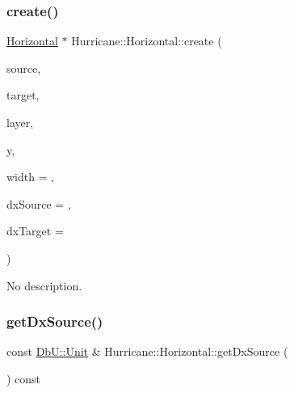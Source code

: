 \subsubsection{\texorpdfstring{create()}{create()}\hspace{0.1cm}{\footnotesize\ttfamily [2/2]}}
{\footnotesize\ttfamily \hyperlink{classHurricane_1_1Horizontal}{Horizontal} $\ast$ Hurricane\+::\+Horizontal\+::create (\begin{DoxyParamCaption}\item[{\hyperlink{classHurricane_1_1Component}{Component} $\ast$}]{source,  }\item[{\hyperlink{classHurricane_1_1Component}{Component} $\ast$}]{target,  }\item[{const \hyperlink{classHurricane_1_1Layer}{Layer} $\ast$}]{layer,  }\item[{const \hyperlink{group__DbUGroup_ga4fbfa3e8c89347af76c9628ea06c4146}{Db\+U\+::\+Unit} \&}]{y,  }\item[{const \hyperlink{group__DbUGroup_ga4fbfa3e8c89347af76c9628ea06c4146}{Db\+U\+::\+Unit} \&}]{width = {},  }\item[{const \hyperlink{group__DbUGroup_ga4fbfa3e8c89347af76c9628ea06c4146}{Db\+U\+::\+Unit} \&}]{dx\+Source = {},  }\item[{const \hyperlink{group__DbUGroup_ga4fbfa3e8c89347af76c9628ea06c4146}{Db\+U\+::\+Unit} \&}]{dx\+Target = {} }\end{DoxyParamCaption})\hspace{0.3cm}{\ttfamily [static]}}

No description. \mbox{\label{classHurricane_1_1Horizontal_a7fdafaa2a7e931413efb2c1fc021f4a8}} 
\subsubsection{\texorpdfstring{get\+Dx\+Source()}{getDxSource()}}
{\footnotesize\ttfamily const \hyperlink{group__DbUGroup_ga4fbfa3e8c89347af76c9628ea06c4146}{Db\+U\+::\+Unit} \& Hurricane\+::\+Horizontal\+::get\+Dx\+Source (\begin{DoxyParamCaption}{ }\end{DoxyParamCaption}) const\hspace{0.3cm}{\ttfamily [inline]}}

